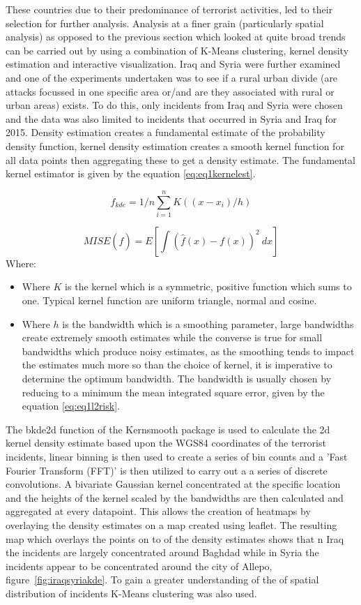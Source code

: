 These countries due to their predominance of terrorist activities, led to their selection for further analysis. Analysis at a finer grain (particularly spatial analysis) as opposed to the previous section which looked at quite broad trends can be carried out by using a combination of K-Means clustering, kernel density estimation and interactive visualization. Iraq and Syria were further examined  and one of the experiments undertaken was to see if a  rural urban divide (are attacks focussed in one specific area or/and are they associated with rural or urban areas) exists. To do this, only incidents from Iraq and Syria were chosen and the data was also limited to incidents that occurred in Syria and Iraq for 2015. 
Density estimation creates a fundamental estimate of the probability density function, kernel density estimation creates a smooth kernel function for all data points then aggregating these to get a density estimate. The fundamental kernel estimator is given by the equation \ref{eq:eq1kernelest}.

\begin{equation} \hat{f}_{kde} = 1/n \sum^n_{i=1} K((x-x_i)/h) \label{eq:eq1kernelest}  \end{equation}

\begin{equation} MISE(\hat{f})=E[\int(\hat{f}(x)-f(x))^2 \ dx]
\label{eq:eq1l2risk}  \end{equation}
Where:
\begin{itemize}
\item[]  Where $K$ is the kernel which is a symmetric, positive function which sums to one. Typical kernel function are uniform triangle, normal and cosine.
\item[]  Where $h$ is the bandwidth which is a smoothing parameter, large bandwidths create extremely smooth estimates while the  converse is true for small bandwidths which produce noisy estimates, as the smoothing tends to impact the estimates much more so than the choice of kernel, it is imperative to determine the optimum bandwidth. The bandwidth is usually chosen by reducing to a minimum the mean integrated square error, given by the equation \ref{eq:eq1l2risk}.
\end{itemize}

The bkde2d function of the Kernsmooth package is used to calculate the 2d kernel density estimate based upon the WGS84 coordinates of the terrorist incidents, linear binning is then used to create a series of bin counts and a 'Fast Fourier Transform (FFT)' is then utilized to carry out a a series of discrete convolutions. A bivariate Gaussian kernel concentrated at the specific location and the heights of the kernel scaled by the bandwidths are then calculated and aggregated at every datapoint. This allows the creation of heatmaps by overlaying the density estimates on a map created using leaflet. The resulting map which overlays the points on to of the density estimates shows that n Iraq the incidents are largely concentrated around Baghdad while in Syria the incidents appear to be concentrated around the city of Allepo, figure~\ref{fig:iraqsyriakde}. To gain a greater understanding of the of spatial distribution of incidents K-Means clustering was also used.


